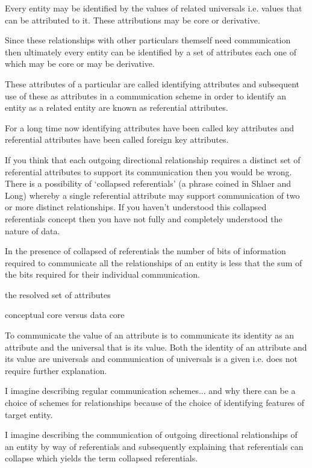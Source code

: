 \mynote Every entity may be identified by the values of related universals i.e. values that can be attributed to it. These attributions  may be core or derivative.

\mynote Since these relationships with other particulars themself need communication then ultimately every entity can be identified by a set of attributes each one of which may be core or may be derivative.  

\mynote
These attributes of a particular are called identifying attributes and subsequent use of these as attributes in a communication scheme in order to identify an entity as a related entity are known as referential attributes. 

\mynote For a long time now identifying attributes have been called key attributes and referential attributes have been called foreign key attributes. 

\mynote If you think that each outgoing directional relationship requires a distinct set of referential attributes to support its communication then you would be wrong. 
There is a possibility of `collapsed referentials' (a phrase coined in Shlaer and Long) whereby a single referential attribute may support communication of two or more distinct relationships. If you haven't understood this collapsed referentials concept then you have not  fully and completely understood the nature of data. 

\mynote In the presence of collapsed of referentials the number of bits of information required to communicate all the relationships of an entity is less that the sum of the bits required for their individual communication. 

\mynote the resolved set of attributes

\mynote conceptual core versus data core

\begin{oldtt}
\mynote To communicate the value of an attribute is to communicate its identity as an attribute and the universal that is its value. Both the identity of an attribute and its value are universals and communication of universals is a given i.e. does not require further explanation. 
\end{oldtt}

\begin{noteforfuture}
I imagine describing regular communication schemes... and why there can be a choice of schemes for relationships because of the choice of identifying features of target entity. 
\end{noteforfuture}
\begin{noteforfuture}
I imagine describing the communication of outgoing directional relationships of an entity by way of referentials and subsequently explaining that referentials can collapse which yields the term collapsed referentials.
\end{noteforfuture}